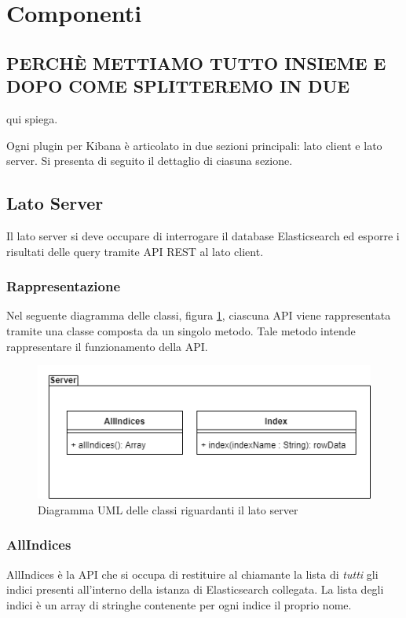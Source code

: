 \section{Componenti}

\subsection{PERCHÈ METTIAMO TUTTO INSIEME E DOPO COME SPLITTEREMO IN DUE}
qui spiega.

Ogni plugin per Kibana è articolato in due sezioni principali: lato client e lato server. Si presenta di seguito il dettaglio di ciasuna sezione.

\subsection{Lato Server}
Il lato server si deve occupare di interrogare il database Elasticsearch ed esporre i risultati delle query tramite API REST al lato client.
\subsubsection{Rappresentazione}
Nel seguente diagramma delle classi, figura \ref{img:diagrammaClassiServer}, ciascuna API viene rappresentata tramite una classe composta da un singolo metodo. Tale metodo intende rappresentare il funzionamento della API.


\begin{figure}[h]
	\centering
	\includegraphics[width=1\textwidth]{Images/DiagrammaClassiServer.png}
	\caption{Diagramma UML delle classi riguardanti il lato server}
	\label{img:diagrammaClassiServer}
\end{figure}

\subsubsection{AllIndices}
AllIndices è la API che si occupa di restituire al chiamante la lista di \emph{tutti} gli indici presenti all'interno della istanza di Elasticsearch collegata. La lista degli indici è un array di stringhe contenente per ogni indice il proprio nome.

